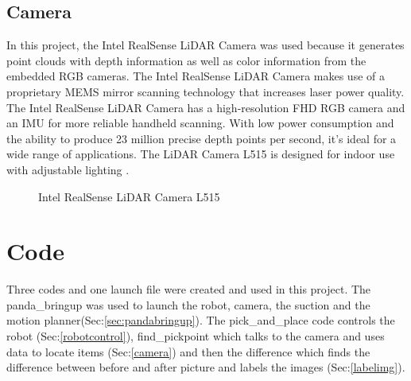\subsection{Camera\label{subsec:camera}} 
In this project, the Intel RealSense LiDAR Camera was used because it generates point clouds with depth information as well as color information from the embedded RGB cameras. The Intel RealSense LiDAR Camera makes use of a proprietary MEMS mirror scanning technology that increases laser power quality. The Intel RealSense LiDAR Camera has a high-resolution FHD RGB camera and an IMU for more reliable handheld scanning. With low power consumption and the ability to produce 23 million precise depth points per second, it's ideal for a wide range of applications. The LiDAR Camera L515 is designed for indoor use with adjustable lighting \cite{noauthor_intel_nodate}.
\begin{figure}[h]
    \centering
    \hfill
    \caption{Intel RealSense LiDAR Camera L515 \cite{noauthor_intel_nodate}}
    \label{figure: lidar}
\end{figure}


\section{Code}
Three codes and one launch file were created and used in this project. The panda\_bringup was used to launch the robot, camera, the suction and the motion planner(Sec:\ref{sec:pandabringup}). 
The pick\_and\_place code controls the robot (Sec:\ref{robotcontrol}), find\_pickpoint which talks to the camera and uses data to locate items (Sec:\ref{camera}) and then the difference which finds the difference between before and after picture and labels the images (Sec:\ref{labelimg}).


